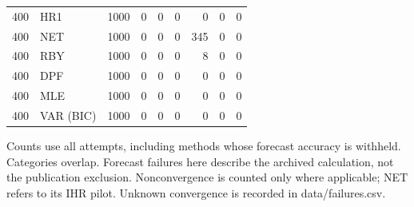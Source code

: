 \begin{table}[p]
{\begin{tabular}{llrrrrrrr}
400 & HR1 & 1000 & 0 & 0 & 0 & 0 & 0 & 0 \\
400 & NET & 1000 & 0 & 0 & 0 & 345 & 0 & 0 \\
400 & RBY & 1000 & 0 & 0 & 0 & 8 & 0 & 0 \\
400 & DPF & 1000 & 0 & 0 & 0 & 0 & 0 & 0 \\
400 & MLE & 1000 & 0 & 0 & 0 & 0 & 0 & 0 \\
400 & VAR (BIC) & 1000 & 0 & 0 & 0 & 0 & 0 & 0 \\
\bottomrule\end{tabular}}
\par\medskip
\begin{minipage}{\linewidth}\footnotesize Counts use all attempts, including methods whose forecast accuracy is withheld. Categories overlap. Forecast failures here describe the archived calculation, not the publication exclusion. Nonconvergence is counted only where applicable; NET refers to its IHR pilot. Unknown convergence is recorded in data/failures.csv. \end{minipage}
\end{table}
